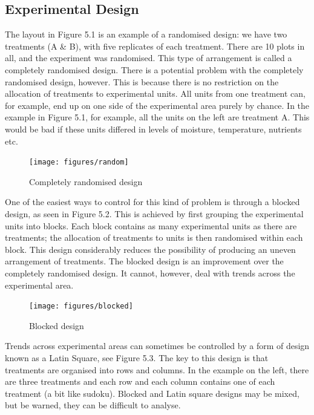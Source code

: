 \documentclass[
]{book}
\begin{document}
\hypertarget{experimental-design}{%
\subsection*{Experimental Design}\label{experimental-design}}

The layout in Figure 5.1 is an example of a randomised design: we have two treatments (A \& B), with five replicates of each treatment. There are 10 plots in all, and the experiment was randomised. This type of arrangement is called a completely randomised design.
There is a potential problem with the completely randomised design, however. This is because there is no restriction on the allocation of treatments to experimental units. All units from one treatment can, for example, end up on one side of the experimental area purely by chance. In the example in Figure 5.1, for example, all the units on the left are treatment A. This would be bad if these units differed in levels of moisture, temperature, nutrients etc.

\begin{figure}
\texttt{[image: figures/random]} \caption{Completely randomised design}\label{fig:unnamed-chunk-43}
\end{figure}

One of the easiest ways to control for this kind of problem is through a blocked design, as seen in Figure 5.2. This is achieved by first grouping the experimental units into blocks. Each block contains as many experimental units as there are treatments; the allocation of treatments to units is then randomised within each block. This design considerably reduces the possibility of producing an uneven arrangement of treatments. The blocked design is an improvement over the completely randomised design. It cannot, however, deal with trends across the experimental area.

\begin{figure}
\texttt{[image: figures/blocked]} \caption{Blocked design}\label{fig:unnamed-chunk-44}
\end{figure}

Trends across experimental areas can sometimes be controlled by a form of design known as a Latin Square, see Figure 5.3. The key to this design is that treatments are organised into rows and columns. In the example on the left, there are three treatments and each row and each column contains one of each treatment (a bit like sudoku). Blocked and Latin square designs may be mixed, but be warned, they can be difficult to analyse.
\end{document}

